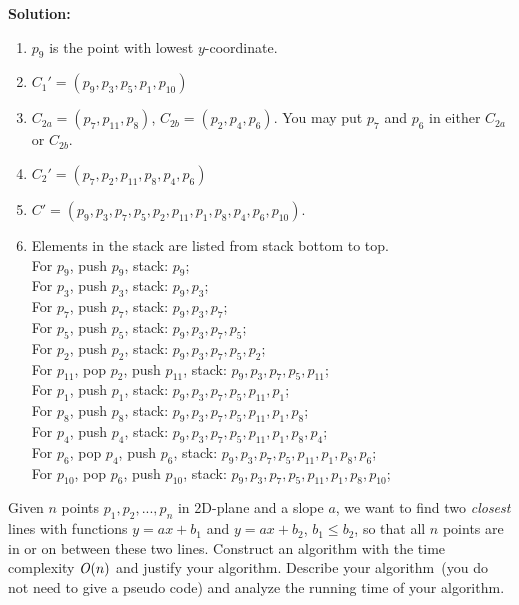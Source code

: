 \documentclass[11pt]{article}
\begin{document}
\begin{qunlist}
\begin{figure}[h]

\end{figure}
\newpage
{\bf Solution:} 
\begin{enumerate}
\item $p_9$ is the point with lowest $y$-coordinate.
\item $C_1'=(p_9,p_3,p_5,p_1,p_{10})$
\item $C_{2a}=(p_7,p_{11},p_8)$, $C_{2b}=(p_2,p_4,p_6)$. You may put $p_7$ and $p_6$ in either $C_{2a}$ or $C_{2b}$.
\item $C_2'=(p_7,p_2,p_{11},p_8,p_4,p_6)$
\item $C'=(p_9,p_3,p_7,p_5,p_2,p_11,p_1,p_8,p_4,p_6,p_{10})$.
\item Elements in the stack are listed from stack bottom to top. \\
For $p_9$, push $p_9$, stack: $p_9$; \\
For $p_3$, push $p_3$, stack: $p_9, p_3$; \\
For $p_7$, push $p_7$, stack: $p_9, p_3, p_7$; \\
For $p_5$, push $p_5$, stack: $p_9, p_3, p_7, p_5$; \\
For $p_2$, push $p_2$, stack: $p_9, p_3, p_7, p_5, p_2$; \\
For $p_{11}$, pop $p_2$, push $p_{11}$, stack: $p_9, p_3, p_7, p_5,p_{11}$; \\
For $p_1$, push $p_1$, stack: $p_9, p_3, p_7, p_5,p_{11},p_1$; \\
For $p_8$, push $p_8$, stack: $p_9, p_3, p_7, p_5,p_{11},p_1,p_8$; \\
For $p_4$, push $p_4$, stack: $p_9, p_3, p_7, p_5,p_{11},p_1,p_8,p_4$; \\
For $p_6$, pop $p_4$, push $p_6$, stack: $p_9, p_3, p_7, p_5,p_{11},p_1,p_8,p_6$; \\
For $p_{10}$, pop $p_6$, push $p_{10}$, stack: $p_9, p_3, p_7, p_5,p_{11},p_1,p_8,p_{10}$; \\

\end{enumerate}


Given $n$ points $p_1, p_2, ..., p_n$ in 2D-plane and a slope $a$, we want to
find two \emph{closest} lines with functions $y = ax + b_1$ and $y = ax + b_2$, $b_1
\leq b_2$, so that all $n$ points are in or on between these two lines.
Construct an algorithm with the time complexity $\mathit{O}(n)$ and justify your
algorithm. Describe your algorithm~(you do not need to give a pseudo code)
and analyze the running time of your algorithm.


\end{qunlist}
\end{document}
